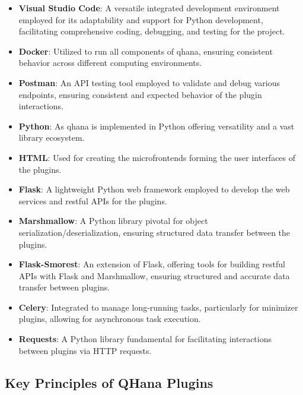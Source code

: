 \documentclass[
  a4paper,  %
  twoside,  %
  bibliography=totoc,
  headsepline,
  cleardoublepage=empty,
  parskip=half,
  draft=false
]{scrbook}
\begin{document}
\begin{itemize}
    \item \textbf{Visual Studio Code}: A versatile integrated development environment employed for its adaptability and support for Python development, facilitating comprehensive coding, debugging, and testing for the project.

    \item \textbf{Docker}: Utilized to run all components of \gls{qhana}, ensuring consistent behavior across different computing environments.

    \item \textbf{Postman}: An API testing tool employed to validate and debug various endpoints, ensuring consistent and expected behavior of the plugin interactions.

    \item \textbf{Python}: As \gls{qhana} is implemented in Python offering versatility and a vast library ecosystem.

    \item \textbf{HTML}: Used for creating the microfrontends forming the user interfaces of the plugins.

    \item \textbf{Flask}: A lightweight Python web framework employed to develop the web services and \gls{rest}ful APIs for the plugins.

    \item \textbf{Marshmallow}: A Python library pivotal for object serialization/deserialization, ensuring structured data transfer between the plugins.

    \item \textbf{Flask-Smorest}: An extension of Flask, offering tools for building \gls{rest}ful APIs with Flask and Marshmallow, ensuring structured and accurate data transfer between plugins.

    \item \textbf{Celery}: Integrated to manage long-running tasks, particularly for minimizer plugins, allowing for asynchronous task execution.

    \item \textbf{Requests}: A Python library fundamental for facilitating interactions between plugins via HTTP requests.
\end{itemize}

\subsection{Key Principles of QHana Plugins}
\end{document}
